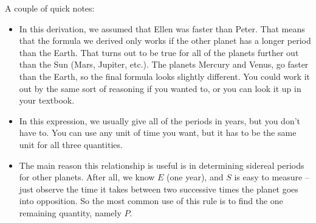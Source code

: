 A couple of quick notes:
\begin{itemize}[nosep]
\item In this derivation, we assumed that Ellen was faster than Peter.
That means that the formula we derived only works if the other
planet has a longer period than the Earth. That turns out to be true
for all of the planets further out than the Sun (Mars, Jupiter, etc.).
The planets Mercury and Venus, go faster than the Earth, so the
final formula looks slightly different. You could work it out by the
same sort of reasoning if you wanted to, or you can look it up in
your textbook.
\item In this expression, we usually give all of the periods in years, but
you don't have to. You can use any unit of time you want, but it has
to be the same unit for all three quantities.
\item The main reason this relationship is useful is in determining
sidereal periods for other planets. After all, we know $E$ (one year),
and $S$ is easy to measure -- just observe the time it takes between
two successive times the planet goes into opposition. So the
most common use of this rule is to find the one remaining quantity,
namely $P$.
\end{itemize}




